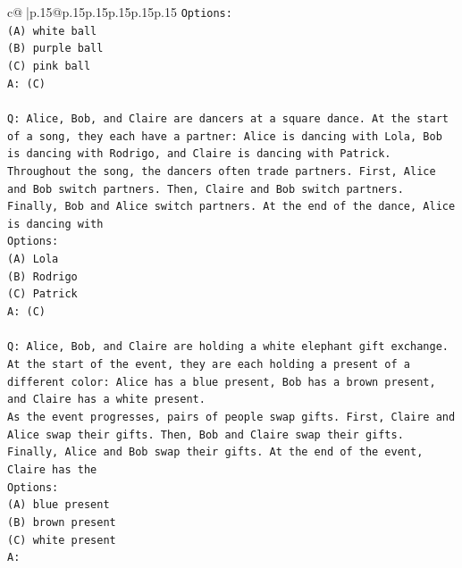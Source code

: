 \documentclass{article}
\begin{document}
{\begin{supertabular}{c@{$\;$}|p{.15\linewidth}@{}p{.15\linewidth}p{.15\linewidth}p{.15\linewidth}p{.15\linewidth}p{.15\linewidth}}
{{{\texttt{Options:} \\
\texttt{(A) white ball} \\
\texttt{(B) purple ball} \\
\texttt{(C) pink ball} \\
\texttt{A: (C)} \\
\\ 
\texttt{Q: Alice, Bob, and Claire are dancers at a square dance. At the start of a song, they each have a partner: Alice is dancing with Lola, Bob is dancing with Rodrigo, and Claire is dancing with Patrick.} \\
\texttt{Throughout the song, the dancers often trade partners. First, Alice and Bob switch partners. Then, Claire and Bob switch partners. Finally, Bob and Alice switch partners. At the end of the dance, Alice is dancing with} \\
\texttt{Options:} \\
\texttt{(A) Lola} \\
\texttt{(B) Rodrigo} \\
\texttt{(C) Patrick} \\
\texttt{A: (C)} \\
\\ 
\texttt{Q: Alice, Bob, and Claire are holding a white elephant gift exchange. At the start of the event, they are each holding a present of a different color: Alice has a blue present, Bob has a brown present, and Claire has a white present.} \\
\texttt{As the event progresses, pairs of people swap gifts. First, Claire and Alice swap their gifts. Then, Bob and Claire swap their gifts. Finally, Alice and Bob swap their gifts. At the end of the event, Claire has the} \\
\texttt{Options:} \\
\texttt{(A) blue present} \\
\texttt{(B) brown present} \\
\texttt{(C) white present} \\
\texttt{A:} \\
            }
        }
    }
     \\ \\


\end{supertabular}}
\end{document}
